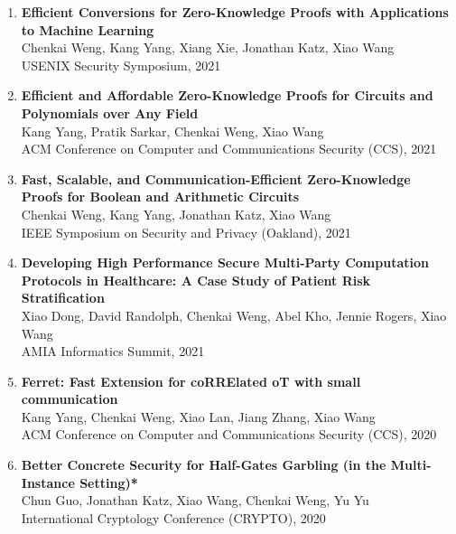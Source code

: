 \documentclass[letterpaper,11pt]{article}
\begin{document}
\begin{enumerate}[leftmargin=0.20in]
  \item
          {\textbf{\small Efficient Conversions for Zero-Knowledge Proofs with Applications to Machine Learning}} \\
		{\small Chenkai Weng, Kang Yang, Xiang Xie, Jonathan Katz, Xiao Wang \vspace{-2pt}} \\
		{\small USENIX Security Symposium, 2021}
  \item
	  {\textbf{\small Efficient and Affordable Zero-Knowledge Proofs for Circuits and Polynomials over Any Field}} \\
		{\small Kang Yang, Pratik Sarkar, Chenkai Weng, Xiao Wang \vspace{-2pt}} \\
		{\small ACM Conference on Computer and Communications Security (CCS), 2021}
  \item
          {\textbf{\small Fast, Scalable, and Communication-Efficient Zero-Knowledge Proofs for Boolean and Arithmetic Circuits}} \\
		{\small Chenkai Weng, Kang Yang, Jonathan Katz, Xiao Wang \vspace{-2pt}} \\
		{\small IEEE Symposium on Security and Privacy (Oakland), 2021}
  \item
          {\textbf{\small Developing High Performance Secure Multi-Party Computation Protocols in Healthcare: A Case Study of Patient Risk Stratification}} \\
		{\small Xiao Dong, David Randolph, Chenkai Weng, Abel Kho, Jennie Rogers, Xiao Wang \vspace{-2pt}} \\
		{\small AMIA Informatics Summit, 2021}
  \item
          {\textbf{\small Ferret: Fast Extension for coRRElated oT with small communication}} \\
		{\small Kang Yang, Chenkai Weng, Xiao Lan, Jiang Zhang, Xiao Wang\vspace{-2pt}} \\
		{\small ACM Conference on Computer and Communications Security (CCS), 2020}
  \item
          {\textbf{\small Better Concrete Security for Half-Gates Garbling (in the Multi-Instance Setting)*}} \\
		{\small Chun Guo, Jonathan Katz, Xiao Wang, Chenkai Weng, Yu Yu\vspace{-2pt}} \\ 
		{\small International Cryptology Conference (CRYPTO), 2020}
\end{enumerate}
\end{document}

